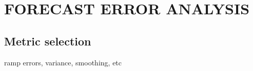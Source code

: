 \chapter{FORECAST ERROR ANALYSIS}
\label{chap:error}

\section{Metric selection}

ramp errors, variance, smoothing, etc


